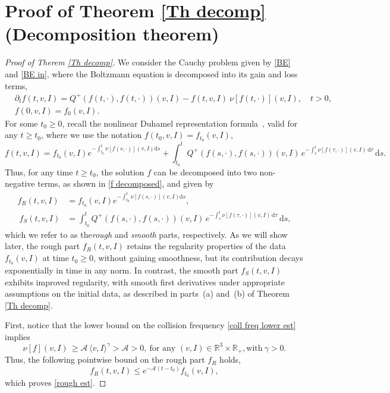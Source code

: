 \documentclass[11pt,a4paper]{amsart}
\newcommand{\bRp}{\mathbb{R}_+}
\newcommand{\bRfp}{\mathbb{R}^3 \times \bRp}
\newcommand{\md}{\mathrm{d}}
\newcommand{\g}{\gamma}
\newcommand{\la}{\langle}
\newcommand{\ra}{\rangle}
\newcommand{\mA}{\mathcal{A}}
\newcommand{\fR}{f_R}
\newcommand{\fS}{f_S}
\begin{document}
\section{Proof of Theorem \ref{Th decomp} (Decomposition theorem)}\label{Sec proof decomp}
\begin{proof}[Proof of Therem \ref{Th decomp}]
We consider the Cauchy problem given by \eqref{BE} and \eqref{BE in}, where the Boltzmann equation is decomposed into its gain and loss terms,
\begin{equation}\label{BE initial}
	\begin{split}
	& \partial_t f(t,v,I) = 	Q^+(f(t,\cdot),f(t,\cdot))(v,I) - f(t,v,I) \	\nu[f(t,\cdot)](v,I), \quad t > 0,\\
	& f(0,v,I) = f_{0}(v,I).
	\end{split}
\end{equation}
For some $t_0 \geq 0$, recall the nonlinear Duhamel representation formula~\cite{MV}, valid for any $t \geq t_0$, where we use the notation $f(t_0, v, I) = f_{t_0}(v, I)$,
\begin{equation*}
	f(t,v,I)  = f_{t_0}(v,I) e^{-\int_{t_0}^t 	\nu[f(s,\cdot)](v,I) \md s}  + \int_{t_0}^t Q^+(f(s,\cdot),f(s,\cdot))(v,I) \, e^{-\int_s^t 	\nu[f(\tau,\cdot)](v,I) \, \md \tau} \, \md s.
\end{equation*}
Thus, for any time $t \geq t_0$, the solution $f$ can be decomposed into two non-negative terms, as shown in \eqref{f decomposed}, and given by
  \begin{equation*}
 	\begin{split}
\fR(t,v,I) & = f_{t_0}(v,I) e^{-\int_{t_0}^t 	\nu[f(s,\cdot)](v,I) \md s}, \\\
\fS(t,v,I) &= \int_{t_0}^t Q^+(f(s,\cdot),f(s,\cdot))(v,I) \, e^{-\int_s^t 	\nu[f(\tau,\cdot)](v,I) \, \md \tau} \, \md s,
\end{split}
 \end{equation*}
which we refer to as the\emph{rough}  and  \emph{smooth}  parts, respectively. As we will show later, the rough part $\fR(t,v,I)$ retains the regularity properties of the  data $f_{t_0}(v,I)$ at time $t_0 \geq 0$,  without gaining smoothness, but its contribution decays exponentially in time in any norm. In contrast, the smooth part $\fS(t,v,I)$ exhibits improved regularity, with smooth first derivatives under appropriate assumptions on the initial data, as described in parts~(a) and~(b) of Theorem \ref{Th decomp}.

First, notice that the lower bound on the collision frequency \eqref{coll freq lower est} implies 
\begin{equation}\label{coll freq lower est 2} 
	\nu[f](v,I) \,   \geq \mA \, \la v, I \ra^{\g} > \mA > 0, \ \text{for any } (v,I) \in \bRfp, \text{with} \ \g>0.
\end{equation} 
Thus, the following pointwise bound on the rough part $\fR$ holds,
\begin{equation*}
\fR(t,v,I)  \leq e^{-\mA (t-t_0)} f_{t_0}(v,I),
\end{equation*}
which proves \eqref{rough est}. 


\end{proof}
\end{document}
